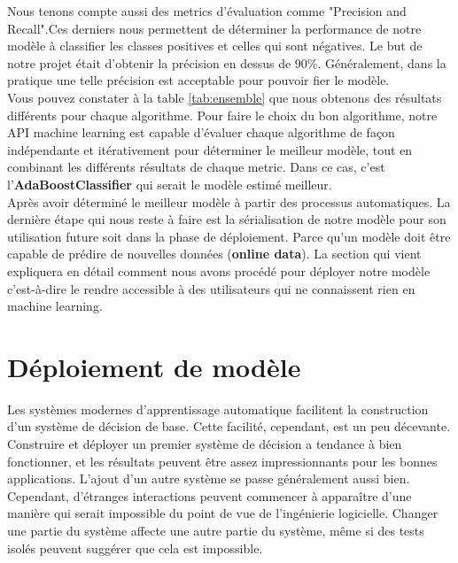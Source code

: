 \documentclass[12pt, french]{report}
\begin{document}
Nous tenons compte aussi des metrics d'évaluation comme "Precision and Recall".Ces derniers nous permettent de déterminer la performance de notre modèle à classifier les classes positives et celles qui sont négatives. Le but de notre projet était d'obtenir la précision en dessus de 90\%. Généralement, dans la pratique une telle précision est acceptable pour pouvoir fier le modèle.\\

Vous pouvez constater à la table \ref{tab:ensemble} que nous obtenons des résultats différents pour chaque algorithme. Pour faire le choix du bon algorithme, notre API machine learning est capable d'évaluer chaque algorithme de façon indépendante et itérativement pour déterminer le meilleur modèle, tout en combinant les différents résultats de chaque metric. Dans ce cas, c'est l'\textbf{AdaBoostClassifier} qui serait le modèle estimé meilleur.  \\

Après avoir déterminé le meilleur modèle à partir des processus automatiques. La dernière étape qui nous reste à faire est la sérialisation de notre modèle pour son utilisation future soit dans la phase de déploiement. Parce qu'un modèle doit être capable de prédire de nouvelles données (\textbf{online data}). La section qui vient expliquera en détail comment nous avons procédé pour déployer notre modèle c'est-à-dire le rendre accessible à des utilisateurs qui ne connaissent rien en machine learning.  \\ 



 

\section{Déploiement de modèle}
Les systèmes modernes d'apprentissage automatique facilitent la construction d'un système de décision de base. Cette facilité, cependant, est un peu décevante. Construire et déployer un premier système de décision a tendance à bien fonctionner, et les résultats peuvent être assez impressionnants pour les bonnes applications. L'ajout d'un autre système se passe généralement aussi bien. Cependant, d'étranges interactions peuvent commencer à apparaître d'une manière qui serait impossible du point de vue de l'ingénierie logicielle. Changer une partie du système affecte une autre partie du système, même si des tests isolés peuvent suggérer que cela est impossible. \\
\end{document}
